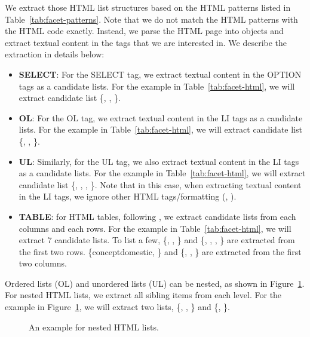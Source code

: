 We extract those HTML list structures based on the HTML patterns listed in Table~\ref{tab:facet-patterns}. Note that we do not match the HTML patterns with the HTML code exactly. Instead, we parse the HTML page into objects and extract textual content in the tags that we are interested in. We describe the extraction in details below:
\begin{itemize}
 \item \textbf{SELECT}: For the SELECT tag, we extract textual content in the OPTION tags as a candidate lists. For the example in Table~\ref{tab:facet-html}, we will extract candidate list \{, , \}.
\item \textbf{OL}: For the OL tag, we extract textual content in the LI tags as a candidate lists. For the example in Table~\ref{tab:facet-html}, we will extract candidate list \{, , \}.
\item \textbf{UL}: Similarly, for the UL tag, we also extract textual content in the LI tags as a candidate lists. For the example in Table~\ref{tab:facet-html}, we will extract candidate list \{, , , \}. Note that in this case, when extracting textual content in the LI tags, we ignore other HTML tags/formatting (\ie, ).
\item \textbf{TABLE}: for HTML tables, following \citet{dou2011finding}, we extract candidate lists from each columns and each rows. For the example in Table~\ref{tab:facet-html}, we will extract 7 candidate lists.
To list a few, \{, , \} and \{, , , \} are extracted from the first two rows. \{concept{domestic}, \} and \{, , \} are extracted from the first two columns.
\end{itemize}


Ordered lists (OL) and unordered lists (UL) can be nested, as shown in Figure~\ref{fig:nestedlist}. For nested HTML lists, we extract all sibling items from each level. For the example in Figure~\ref{fig:nestedlist}, we will extract two lists,
\{, , \} and \{, \}.

\begin{figure}[ht!]
\centering
{}
\caption{An example for nested HTML lists.}
\label{fig:nestedlist}
\end{figure}

